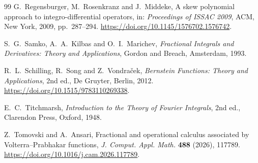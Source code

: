 \documentclass[11pt]{article}
\numberwithin{equation}{section}
\theoremstyle{definition}
\theoremstyle{remark}
\begin{document}
\begin{thebibliography}{99}
G.~Regensburger, M.~Rosenkranz and J.~Middeke,
A skew polynomial approach to integro-differential operators,
in: \emph{Proceedings of ISSAC 2009}, ACM, New York, 2009, pp.~287--294.
\url{https://doi.org/10.1145/1576702.1576742}.

S.~G.~Samko, A.~A.~Kilbas and O.~I.~Marichev,
\emph{Fractional Integrals and Derivatives: Theory and Applications},
Gordon and Breach, Amsterdam, 1993.

R.~L.~Schilling, R.~Song and Z.~Vondra\v{c}ek,
\emph{Bernstein Functions: Theory and Applications}, 2nd ed.,
De Gruyter, Berlin, 2012.
\url{https://doi.org/10.1515/9783110269338}.

E.~C.~Titchmarsh,
\emph{Introduction to the Theory of Fourier Integrals}, 2nd ed.,
Clarendon Press, Oxford, 1948.

Z.~Tomovski and A.~Ansari,
Fractional and operational calculus associated by Volterra--Prabhakar functions,
\emph{J. Comput. Appl. Math.} \textbf{488} (2026), 117789.
\url{https://doi.org/10.1016/j.cam.2026.117789}.

\end{thebibliography}
\end{document}
